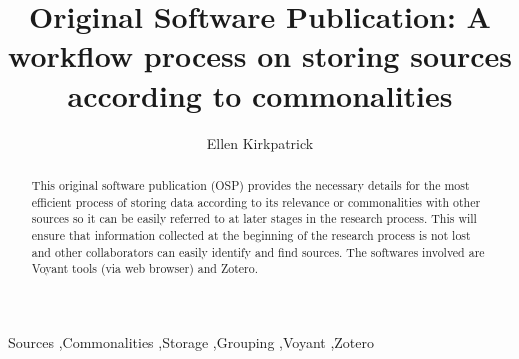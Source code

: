 \documentclass[preprint,12pt, a4paper]{elsarticle}
\begin{document}
\begin{frontmatter}



\title{Original Software Publication: A workflow process on storing sources according to commonalities}


\author{Ellen Kirkpatrick}

\address{Macquarie University, Sydney Australia}

\begin{abstract}
This original software publication (OSP) provides the necessary details for the most efficient process of storing data according to its relevance or commonalities with other sources so it can be easily referred to at later stages in the research process. This will ensure that information collected at the beginning of the research process is not lost and other collaborators can easily identify and find sources. The softwares involved are Voyant tools (via web browser) and Zotero. 

\end{abstract}

\begin{keyword}
Sources \sep Commonalities \sep Storage \sep Grouping \sep Voyant \sep Zotero



\end{keyword}

\end{frontmatter}
\end{document}
